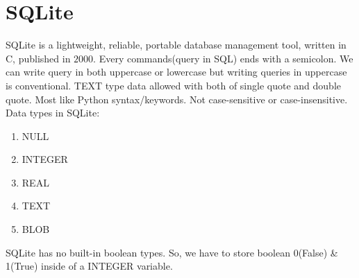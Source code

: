 \documentclass[12 pt, letterpaper]{extarticle}
\begin{document}
\section*{SQLite}
	\justify
	{
	SQLite is a lightweight, reliable, portable database management tool, written in C, published in $2000$. Every commands(query in SQL) ends with a semicolon. We can write query in both uppercase or lowercase but writing queries in uppercase is conventional. TEXT type data allowed with both of single quote and double quote. Most like Python syntax/keywords. Not case-sensitive or case-insensitive.\\
	}
	Data types in SQLite:
	\begin{enumerate}
		\item NULL
		\item INTEGER
		\item REAL
		\item TEXT
		\item BLOB
	\end{enumerate}
	SQLite has no built-in boolean types. So, we have to store boolean 0(False) \& 1(True) inside of a INTEGER variable.\\
\end{document}
